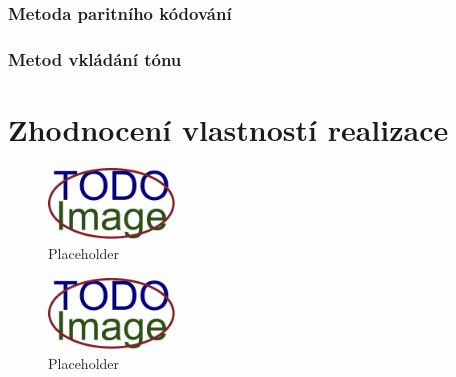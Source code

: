 
\blindtext

\subsection*{Metoda paritního kódování}
\label{sub:parity-coding-implementation}


\blindtext

\subsection*{Metod vkládání tónu}
\label{sub:tone-insertion-implementation}


\blindtext


\chapter{Zhodnocení vlastností realizace}
\label{cha:method-evaluation}


\blindtext

\blindtext

\begin{figure}[hbt]
    \centering
    \includegraphics[width=0.3\textwidth]{obrazky/placeholder.pdf}
    \caption{Placeholder}
    \label{pic:placeholder}
\end{figure}

\blindtext

\begin{figure}[hbt]
    \centering
    \includegraphics[width=0.3\textwidth]{obrazky/placeholder.pdf}
    \caption{Placeholder}
    \label{pic:placeholder}
\end{figure}

\blindtext

